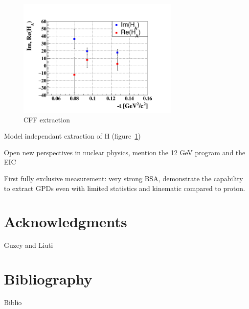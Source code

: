 \documentclass[%
 reprint,
 amsmath,amssymb,
 aps,
]{revtex4-1}
\begin{document}
\begin{figure}[htbp]
\caption{\label{fig:CFF} CFF extraction}
\includegraphics[width=8cm]{HA_t.png}
\end{figure}


Model independant extraction of H (figure~\ref{fig:CFF})



Open new perspectives in nuclear physics, mention the 12 GeV program and the EIC

First fully exclusive measurement: very strong BSA, demonstrate the capability to extract GPDs even with limited statistics and kinematic compared to proton.


\section*{Acknowledgments}
Guzey and Liuti

\section*{Bibliography}
Biblio
\end{document}
